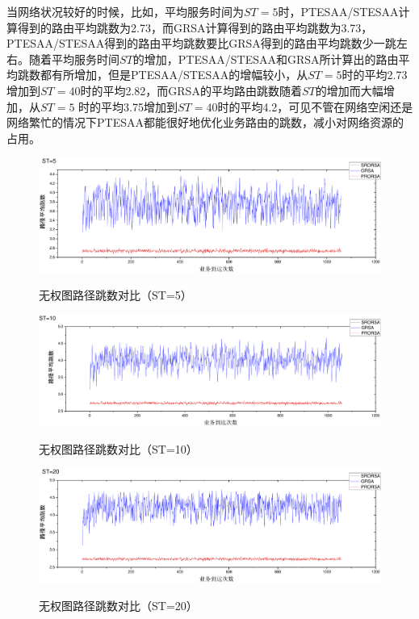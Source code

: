 当网络状况较好的时候，比如，平均服务时间为$ST=5$时，PTESAA/STESAA计算得到的路由平均跳数为2.73，而GRSA计算得到的路由平均跳数为3.73，PTESAA/STESAA得到的路由平均跳数要比GRSA得到的路由平均跳数少一跳左右。随着平均服务时间$ST$的增加，PTESAA/STESAA和GRSA所计算出的路由平均跳数都有所增加，但是PTESAA/STESAA的增幅较小，从$ST=5$时的平均2.73增加到$ST=40$时的平均2.82，而GRSA的平均路由跳数随着$ST$的增加而大幅增加，从$ST=5$ 时的平均3.75增加到$ST=40$时的平均4.2，可见不管在网络空闲还是网络繁忙的情况下PTESAA都能很好地优化业务路由的跳数，减小对网络资源的占用。
\begin{figure}
\setlength{\belowcaptionskip}{-0.5cm}
\begin{center}
{\includegraphics[width=1 \textwidth]{figures/B5H.pdf}}
\end{center}
\caption{{\footnotesize{无权图路径跳数对比（ST=5）}}}
\label{B5H}
\end{figure}
\begin{figure}
\setlength{\belowcaptionskip}{-0.5cm}
\begin{center}
{\includegraphics[width=1 \textwidth]{figures/B10H.pdf}}
\end{center}
\caption{{\footnotesize{无权图路径跳数对比（ST=10）}}}
\label{B10H}
\end{figure}
\begin{figure}
\setlength{\belowcaptionskip}{-0.5cm}
\begin{center}
{\includegraphics[width=1 \textwidth]{figures/B20H.pdf}}
\end{center}
\caption{{\footnotesize{无权图路径跳数对比（ST=20）}}}
\label{B20H}
\end{figure}
